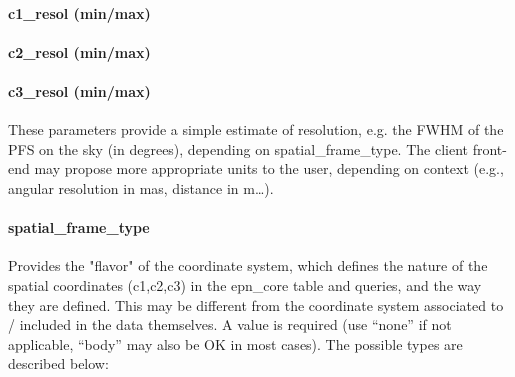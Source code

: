 \documentclass[11pt,a4paper]{ivoa}
\begin{document}
\paragraph{c1\_resol (min/max)}

\paragraph{c2\_resol (min/max)}

\paragraph{c3\_resol (min/max)}

These parameters provide a simple estimate of resolution, e.g. the FWHM of the PFS on the sky (in degrees), depending on spatial\_frame\_type. The client front-end may propose more appropriate units to the user, depending on context (e.g., angular resolution in mas, distance in m…).

\paragraph{spatial\_frame\_type}

Provides the "flavor" of the coordinate system, which defines the nature of the spatial coordinates (c1,c2,c3) in the epn\_core table and queries, and the way they are defined. This may be different from the coordinate system associated to / included in the data themselves. A value is required (use ``none'' if not applicable, ``body'' may also be OK in most cases). The possible types are described below:
\end{document}
